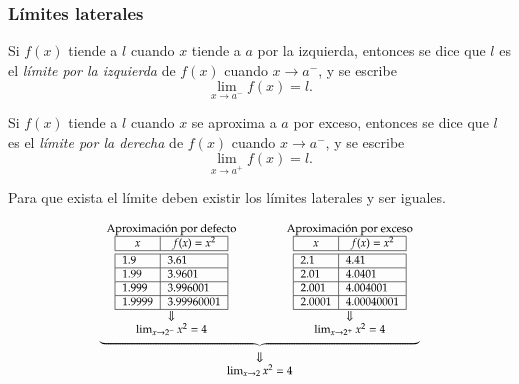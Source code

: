 \begin{frame}
\frametitle{Límites laterales}

 Si $f(x)$ tiende a $l$ cuando $x$ tiende a $a$ por la izquierda, entonces se dice que $l$ es el \emph{límite por la izquierda} de $f(x)$ cuando $x\rightarrow a^-$, y se escribe
\[\lim_{x\rightarrow a^-}f(x)=l.\]

 Si $f(x)$ tiende a $l$ cuando $x$ se aproxima a $a$ por exceso, entonces se dice que $l$ es el \emph{límite por la derecha} de $f(x)$ cuando $x\rightarrow a^-$, y se escribe
\[\lim_{x\rightarrow a^+}f(x)=l.\]

\begin{center}
\alert{Para que exista el límite deben existir los límites laterales y ser iguales.}
\end{center}
\[
\footnotesize
\begin{array}{c}
\underbrace{\begin{array}{ccc}
\textrm{Aproximación por defecto} & \qquad & \textrm{Aproximación por exceso}\\
\begin{array}{|l|l|}
\hline
\multicolumn{1}{|c|}{x}      & \multicolumn{1}{c|}{f(x)=x^2}   \\
\hline\hline
 1.9    & 3.61       \\
\hline
 1.99   & 3.9601     \\
\hline
 1.999  & 3.996001   \\
\hline
 1.9999 & 3.99960001 \\
\hline
\end{array}
& &
\begin{array}{|l|l|}
\hline
\multicolumn{1}{|c|}{x}      & \multicolumn{1}{c|}{f(x)=x^2}   \\
\hline\hline
 2.1    & 4.41       \\
\hline
 2.01   & 4.0401    \\
\hline
 2.001  & 4.004001   \\
\hline
 2.0001 & 4.00040001 \\
\hline
\end{array}\\
\Downarrow & & \Downarrow\\
\lim_{x\rightarrow 2^-}x^2=4
& &
\lim_{x\rightarrow 2^+}x^2=4
\end{array}}\\
\Downarrow\\
\lim_{x\rightarrow 2}x^2=4
\end{array}
\]
\end{frame}


